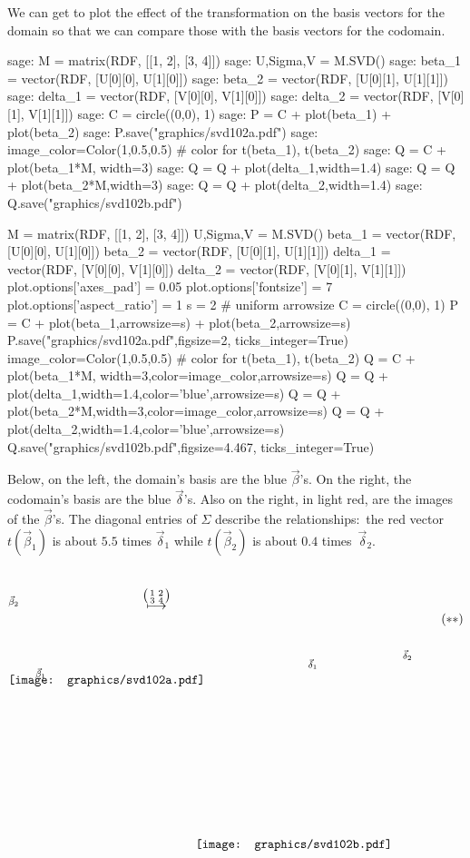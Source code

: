 We can get \Sage{} to plot the effect of the transformation
on the basis vectors for the domain so that we can compare those with the
basis vectors for the codomain.
\begin{sagecommandline}
sage: M = matrix(RDF, [[1, 2], [3, 4]])
sage: U,Sigma,V = M.SVD()
sage: beta_1 = vector(RDF, [U[0][0], U[1][0]])
sage: beta_2 = vector(RDF, [U[0][1], U[1][1]])
sage: delta_1 = vector(RDF, [V[0][0], V[1][0]])
sage: delta_2 = vector(RDF, [V[0][1], V[1][1]])
sage: C = circle((0,0), 1)
sage: P = C + plot(beta_1) + plot(beta_2)
sage: P.save("graphics/svd102a.pdf")
sage: image_color=Color(1,0.5,0.5)   # color for t(beta_1), t(beta_2)
sage: Q = C + plot(beta_1*M, width=3) 
sage: Q = Q + plot(delta_1,width=1.4) 
sage: Q = Q + plot(beta_2*M,width=3) 
sage: Q = Q + plot(delta_2,width=1.4)
sage: Q.save("graphics/svd102b.pdf")
\end{sagecommandline}
\begin{sagesilent}
M = matrix(RDF, [[1, 2], [3, 4]])
U,Sigma,V = M.SVD()
beta_1 = vector(RDF, [U[0][0], U[1][0]])
beta_2 = vector(RDF, [U[0][1], U[1][1]])
delta_1 = vector(RDF, [V[0][0], V[1][0]])
delta_2 = vector(RDF, [V[0][1], V[1][1]])
plot.options['axes_pad'] = 0.05
plot.options['fontsize'] = 7
plot.options['aspect_ratio'] = 1
s = 2  # uniform arrowsize
C = circle((0,0), 1)
P = C + plot(beta_1,arrowsize=s) + plot(beta_2,arrowsize=s)
P.save("graphics/svd102a.pdf",figsize=2, ticks_integer=True)
image_color=Color(1,0.5,0.5)   # color for t(beta_1), t(beta_2)
Q = C + plot(beta_1*M, width=3,color=image_color,arrowsize=s) 
Q = Q + plot(delta_1,width=1.4,color='blue',arrowsize=s) 
Q = Q + plot(beta_2*M,width=3,color=image_color,arrowsize=s) 
Q = Q + plot(delta_2,width=1.4,color='blue',arrowsize=s)
Q.save("graphics/svd102b.pdf",figsize=4.467, ticks_integer=True)
\end{sagesilent}
Below, on the left, the domain's basis are the blue $\vec{\beta}$'s.
On the right, the codomain's basis are the blue $\vec{\delta}$'s.
Also on the right, in light red, are the images of the $\vec{\beta}$'s.
The diagonal entries of $\Sigma$ describe the relationships:~the
red vector~$t(\vec{\beta}_1)$ is about $5.5$ times $\vec{\delta}_1$
while $t(\vec{\beta}_2)$ is about $0.4$ times~$\vec{\delta}_2$.
\begin{equation*}
  \setlength{\unitlength}{1in}
  \begin{picture}(1.35,1.35)
    \put(0,1.825){\texttt{[image: graphics/svd102a.pdf]}}
    \put(.3,1.9){\scriptsize $\vec{\beta}_1$}
    \put(0,2.7){\scriptsize $\vec{\beta}_2$}
  \end{picture}
  \quad
  \raisebox{2.65in}{$\mapsunder{\big (\begin{smallmatrix} 1 &2 \\ 3 &4 \end{smallmatrix}\big )}$}
  \qquad
  \begin{picture}(2.45,3.15)
    \put(0,0){\texttt{[image: graphics/svd102b.pdf]}}
    \put(1.25,2){\scriptsize $\vec{\delta}_1$}
    \put(2.3,2.1){\scriptsize $\vec{\delta}_2$}
  \end{picture}
  \tag*{\raisebox{2.5in}{($**$)}}
\end{equation*}
